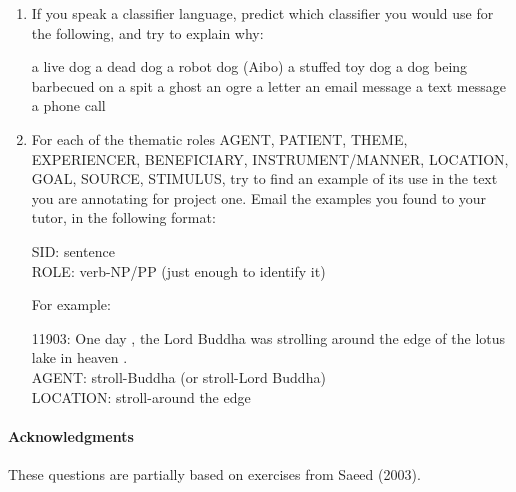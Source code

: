 \documentclass[a4paper]{article}
\begin{document}
\begin{enumerate}
\newpage

\item If you speak a classifier language, predict which classifier you
  would use for the following, and try to explain why:

  \begin{exe}
    \ex a live dog
    \ex a dead dog
    \ex a robot dog (Aibo)
    \ex a stuffed toy dog
    \ex a dog being barbecued on a spit
    \ex a ghost
    \ex an ogre
  \ex a letter
  \ex an email message
  \ex a text message
  \ex a phone call
  \end{exe}

\item For each of the thematic roles AGENT, PATIENT, THEME,
  EXPERIENCER, BENEFICIARY, INSTRUMENT/MANNER, LOCATION, GOAL, SOURCE,
  STIMULUS, try to find an example of its use in the text you are
  annotating for project one.  
  Email the examples you found to your tutor, in the following format:
  \begin{flushleft}
    SID: sentence \\
    ROLE: verb-NP/PP (just enough to identify it)
  \end{flushleft}
   For example:
  \begin{flushleft}
    11903: One day , the Lord Buddha was strolling around the edge of the lotus lake in heaven .\\
    AGENT: stroll-Buddha (or stroll-Lord Buddha)\\
    LOCATION: stroll-around the edge\\
  \end{flushleft}

\end{enumerate}




\vfill
\paragraph{Acknowledgments} These questions are partially
based on exercises from Saeed (2003).
\end{document}

